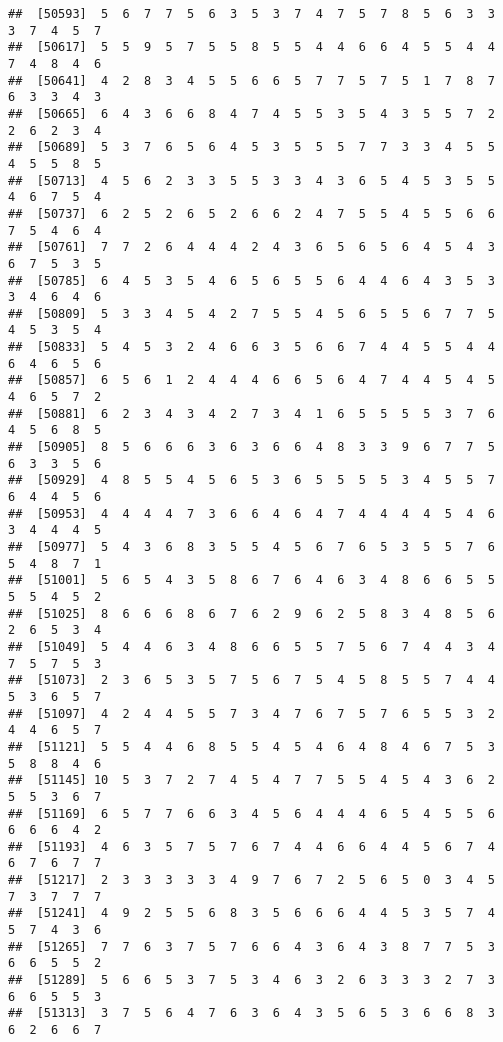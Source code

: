 \documentclass[
]{book}
\begin{document}
\begin{verbatim}
##  [50593]  5  6  7  7  5  6  3  5  3  7  4  7  5  7  8  5  6  3  3  3  7  4  5  7
##  [50617]  5  5  9  5  7  5  5  8  5  5  4  4  6  6  4  5  5  4  4  7  4  8  4  6
##  [50641]  4  2  8  3  4  5  5  6  6  5  7  7  5  7  5  1  7  8  7  6  3  3  4  3
##  [50665]  6  4  3  6  6  8  4  7  4  5  5  3  5  4  3  5  5  7  2  2  6  2  3  4
##  [50689]  5  3  7  6  5  6  4  5  3  5  5  5  7  7  3  3  4  5  5  4  5  5  8  5
##  [50713]  4  5  6  2  3  3  5  5  3  3  4  3  6  5  4  5  3  5  5  4  6  7  5  4
##  [50737]  6  2  5  2  6  5  2  6  6  2  4  7  5  5  4  5  5  6  6  7  5  4  6  4
##  [50761]  7  7  2  6  4  4  4  2  4  3  6  5  6  5  6  4  5  4  3  6  7  5  3  5
##  [50785]  6  4  5  3  5  4  6  5  6  5  5  6  4  4  6  4  3  5  3  3  4  6  4  6
##  [50809]  5  3  3  4  5  4  2  7  5  5  4  5  6  5  5  6  7  7  5  4  5  3  5  4
##  [50833]  5  4  5  3  2  4  6  6  3  5  6  6  7  4  4  5  5  4  4  6  4  6  5  6
##  [50857]  6  5  6  1  2  4  4  4  6  6  5  6  4  7  4  4  5  4  5  4  6  5  7  2
##  [50881]  6  2  3  4  3  4  2  7  3  4  1  6  5  5  5  5  3  7  6  4  5  6  8  5
##  [50905]  8  5  6  6  6  3  6  3  6  6  4  8  3  3  9  6  7  7  5  6  3  3  5  6
##  [50929]  4  8  5  5  4  5  6  5  3  6  5  5  5  5  3  4  5  5  7  6  4  4  5  6
##  [50953]  4  4  4  4  7  3  6  6  4  6  4  7  4  4  4  4  5  4  6  3  4  4  4  5
##  [50977]  5  4  3  6  8  3  5  5  4  5  6  7  6  5  3  5  5  7  6  5  4  8  7  1
##  [51001]  5  6  5  4  3  5  8  6  7  6  4  6  3  4  8  6  6  5  5  5  5  4  5  2
##  [51025]  8  6  6  6  8  6  7  6  2  9  6  2  5  8  3  4  8  5  6  2  6  5  3  4
##  [51049]  5  4  4  6  3  4  8  6  6  5  5  7  5  6  7  4  4  3  4  7  5  7  5  3
##  [51073]  2  3  6  5  3  5  7  5  6  7  5  4  5  8  5  5  7  4  4  5  3  6  5  7
##  [51097]  4  2  4  4  5  5  7  3  4  7  6  7  5  7  6  5  5  3  2  4  4  6  5  7
##  [51121]  5  5  4  4  6  8  5  5  4  5  4  6  4  8  4  6  7  5  3  5  8  8  4  6
##  [51145] 10  5  3  7  2  7  4  5  4  7  7  5  5  4  5  4  3  6  2  5  5  3  6  7
##  [51169]  6  5  7  7  6  6  3  4  5  6  4  4  4  6  5  4  5  5  6  6  6  6  4  2
##  [51193]  4  6  3  5  7  5  7  6  7  4  4  6  6  4  4  5  6  7  4  6  7  6  7  7
##  [51217]  2  3  3  3  3  3  4  9  7  6  7  2  5  6  5  0  3  4  5  7  3  7  7  7
##  [51241]  4  9  2  5  5  6  8  3  5  6  6  6  4  4  5  3  5  7  4  5  7  4  3  6
##  [51265]  7  7  6  3  7  5  7  6  6  4  3  6  4  3  8  7  7  5  3  6  6  5  5  2
##  [51289]  5  6  6  5  3  7  5  3  4  6  3  2  6  3  3  3  2  7  3  6  6  5  5  3
##  [51313]  3  7  5  6  4  7  6  3  6  4  3  5  6  5  3  6  6  8  3  6  2  6  6  7

\end{verbatim}
\end{document}
